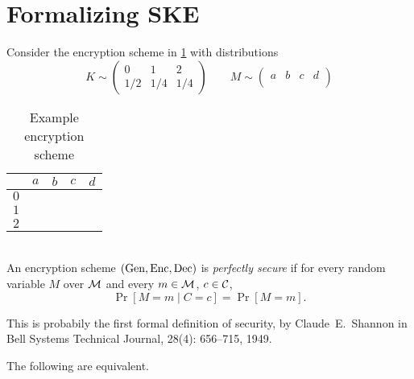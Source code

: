 \section{Formalizing SKE} \label{sec:formalizing-ske}

\begin{exercise}
    Consider the encryption scheme in \cref{tab:enc1}
    with distributions \[
        K \sim \begin{pmatrix}
            0 & 1 & 2 \\
            1/2 & 1/4 & 1/4
        \end{pmatrix} \qquad
        M \sim \begin{pmatrix}
            a & b & c & d \\
             &  &  & 
        \end{pmatrix}
    \]
\end{exercise}
\begin{table}
    \centering
    \begin{tabular}{ccccc}
        \toprule
        & $a$ & $b$ & $c$ & $d$ \\
        \midrule
        $0$ & \\
        $1$ & \\
        $2$ & \\
        \bottomrule
    \end{tabular}
    \caption{Example encryption scheme}
    \label{tab:enc1}
\end{table}

\begin{definition*} \label{def:ske:perfect}
    \;\\
    An encryption scheme $(\operatorname{Gen}, \operatorname{Enc}, \operatorname{Dec})$ is \emph{perfectly secure}
    if for every random variable $M$ over $\mathcal{M}$ and
    every $m \in \mathcal{M}$, $c \in \mathcal{C}$, \[
        \Pr[M = m \mid C = c] = \Pr[M = m].
    \]
\end{definition*}
\begin{remark}
    This is probabily the first formal definition of security,
    by Claude~E.~Shannon in
    Bell Systems Technical Journal, 28(4): 656--715, 1949.
\end{remark}
\begin{proposition}
    The following are equivalent.
\end{proposition}

